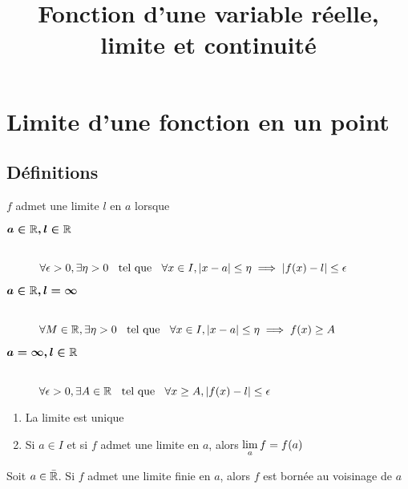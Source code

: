 

\title{Fonction d'une variable réelle, limite et continuité}



\maketitle
\pagebreak

\section{Limite d'une fonction en un point}

\subsection{Définitions}

\begin{dfn} 
$f$ admet une limite $l$ en $a$ lorsque
\begin{description}
    \item[$\boldsymbol{a \in \mathbb{R}, l \in \mathbb{R}}$] \hfill \\
    $\forall \epsilon > 0, \exists \eta > 0 \;\;\text{ tel que }\;\; \forall x \in I, |x - a|
    \leq \eta \implies |f(x) - l| \leq \epsilon$
    \item[$\boldsymbol{a \in \mathbb{R}, l = \infty}$] \hfill \\
    $\forall M \in \mathbb{R}, \exists \eta > 0 \;\;\text{ tel que }\;\; \forall x \in I,
    |x - a| \leq \eta \implies f(x) \geq A$
    \item[$\boldsymbol{a = \infty, l \in \mathbb{R}}$] \hfill \\
    $\forall \epsilon > 0, \exists A \in \mathbb{R} \;\;\text{ tel que }\;\; \forall x \geq A,
    |f(x) - l| \leq \epsilon$
\end{description}
\end{dfn}

\begin{prp} 
\begin{enumerate}
    \item La limite est unique
    \item Si $a \in I$ et si $f$ admet une limite en $a$, alors
    $\lim\limits_{a} f = f(a)$
\end{enumerate}
\end{prp}

\begin{prp} 
Soit $a \in \bar{\mathbb{R}}$. Si $f$ admet une limite finie en $a$, alors
$f$ est bornée au voisinage de $a$
\end{prp}

